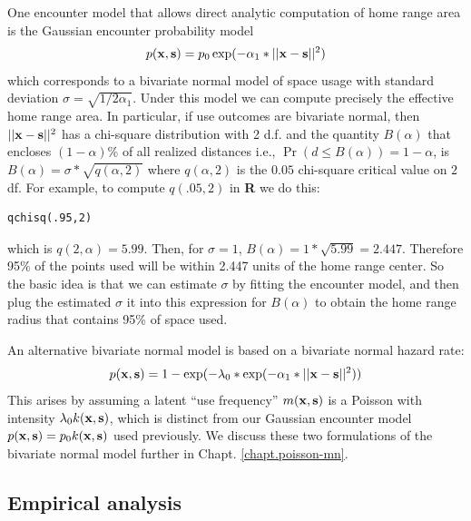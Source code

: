 One encounter model that allows direct analytic computation
of home range area is the Gaussian encounter probability model 
\[
p({\bf x},{\bf s}) = p_{0} \exp(-\alpha_{1}*||{\bf x}-{\bf s}||^2)         
\]
which corresponds to a bivariate normal model of space usage with
standard deviation $\sigma = \sqrt{1/2\alpha_{1}}$.  Under this model
we can compute precisely the effective home range area. In particular,
if use outcomes are bivariate normal, then $||{\bf x}-{\bf s}||^2$ has
a chi-square distribution with 2 d.f. and the quantity $B(\alpha)$
that encloses $(1-\alpha)$\% of all realized distances i.e., $\Pr(d\le
B(\alpha)) = 1-\alpha$, is $B(\alpha) = \sigma*\sqrt{q(\alpha,2)}$
where $q(\alpha,2)$ is the $0.05$ chi-square critical value on $2$ df. For
example, to compute  $q(.05, 2)$ in {\bf R} we do this:
\begin{verbatim}
qchisq(.95,2)
\end{verbatim}
which is $q(2,\alpha) = 5.99$. Then, for $\sigma=1$, $B(\alpha) =
1*\sqrt{5.99} = 2.447$.  Therefore 95\% of the points used will be
within 2.447 units of the home range center. So the basic idea is that
we can estimate $\sigma$ by fitting the encounter model, and then plug
the estimated $\sigma$ it into this expression for $B(\alpha)$ to
obtain the home range radius that contains 95\% of space used.

An alternative bivariate normal model is based on a bivariate normal hazard rate:
\begin{equation}
p({\bf x},{\bf s}) = 1-\exp(-\lambda_{0}*\exp(-\alpha_{1}*||{\bf x}-{\bf s}||^2))
\label{scr0.eq.hazard}
\end{equation}
This arises by assuming a latent ``use frequency'' $m({\bf x},{\bf
  s})$  is a Poisson with intensity $\lambda_0 k({\bf x},{\bf
  s})$, which is  distinct from our Gaussian encounter model $p({\bf x},{\bf s}) =
p_0 k({\bf x},{\bf s})$ used previously.  We discuss these two formulations of
the bivariate normal model further in 
Chapt. \ref{chapt.poisson-mn}.

\subsection{Empirical analysis}

